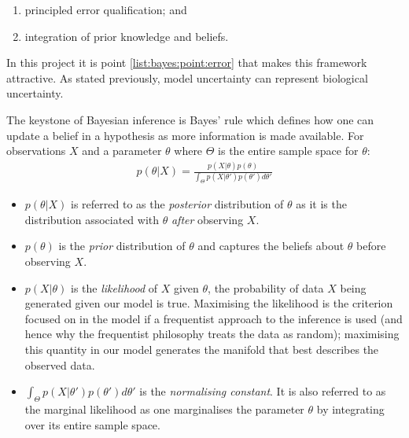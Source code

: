 \documentclass[12pt]{article} %
\begin{document}
	\begin{enumerate} \label{list:bayes}
		\item \label{list:bayes:point:error} principled error qualification; and 
		\item integration of prior knowledge and beliefs. %
	\end{enumerate}
	In this project it is point \ref{list:bayes:point:error} that makes this framework attractive. As stated previously, model uncertainty can represent biological uncertainty.
	
	The keystone of Bayesian inference is Bayes' rule which defines how one can update a belief in a hypothesis as more information is made available. For observations $X$ and a parameter $\theta$ where $\Theta$ is the entire sample space for $\theta$:
	\begin{align} \label{Bayes_theorem}
	p(\theta | X) = \frac{p(X | \theta) p(\theta)}{\int_\Theta p(X | \theta ') p(\theta ') d \theta '}
	\end{align}
	\begin{itemize}
		\item $p(\theta | X)$ is referred to as the \emph{posterior} distribution of $\theta$ as it is the distribution associated with $\theta$ \emph{after} observing $X$.
		\item $p(\theta)$ is the \emph{prior} distribution of $\theta$ and captures the beliefs about $\theta$ before observing $X$.
		\item $p(X | \theta)$ is the \emph{likelihood} of $X$ given $\theta$, the probability of data $X$ being generated given our model is true. Maximising the likelihood is the criterion focused on in the model if a frequentist approach to the inference is used (and hence why the frequentist philosophy treats the data as random); maximising this quantity in our model generates the manifold that best describes the observed data. 
		\item $\int_\Theta p(X | \theta ') p(\theta ') d \theta '$ is the \emph{normalising constant}. It is also referred to as the marginal likelihood as one marginalises the parameter $\theta$ by integrating over its entire sample space.
	\end{itemize}
	
\end{document}
